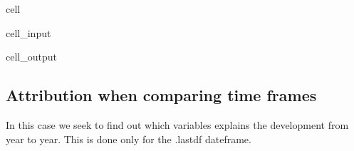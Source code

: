 \documentclass[letterpaper,10pt,english]{jupyterBook}
\begin{document}
\begin{sphinxuseclass}{cell}\begin{sphinxVerbatimInput}

\begin{sphinxuseclass}{cell_input}
\begin{sphinxVerbatim}[commandchars=\\\{\}]
 
\end{sphinxVerbatim}

\end{sphinxuseclass}\end{sphinxVerbatimInput}
\begin{sphinxVerbatimOutput}

\begin{sphinxuseclass}{cell_output}
\noindent{}

\end{sphinxuseclass}\end{sphinxVerbatimOutput}

\end{sphinxuseclass}

\subsection{Attribution when comparing time frames}
\label{\detokenize{content/06_ModelAnalytics/AttributionSomeFeatures:attribution-when-comparing-time-frames}}
\sphinxAtStartPar
In this case we seek to find out which variables explains the development from year to year. This is done only for the .lastdf dateframe.
\end{document}
